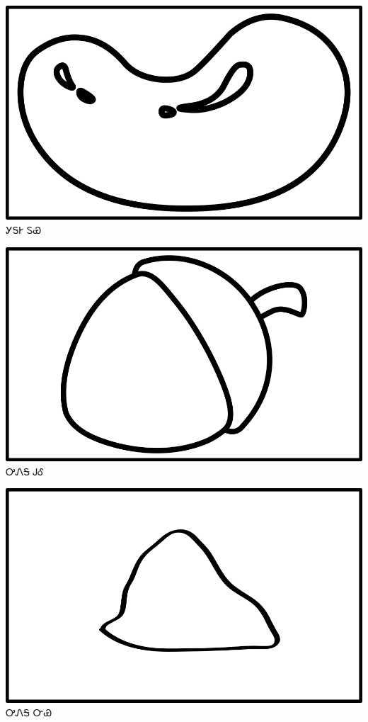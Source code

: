 \documentclass[avery5371]{flashcards}%
\begin{document}
\begin{flashcard}{
\includegraphics[width=0.95\columnwidth,height=.51\columnwidth,keepaspectratio]{../artwork/objects-neutral/tuya}
}\Huge ᎩᎦᎨ ᏚᏯ
\end{flashcard}

\begin{flashcard}{
\includegraphics[width=0.95\columnwidth,height=.51\columnwidth,keepaspectratio]{../artwork/objects-neutral/gule}
}\Huge ᎤᏁᎦ ᎫᎴ
\end{flashcard}

\begin{flashcard}{
\includegraphics[width=0.95\columnwidth,height=.51\columnwidth,keepaspectratio]{../artwork/objects-neutral/nvya}
}\Huge ᎤᏁᎦ ᏅᏯ
\end{flashcard}
\end{document}
